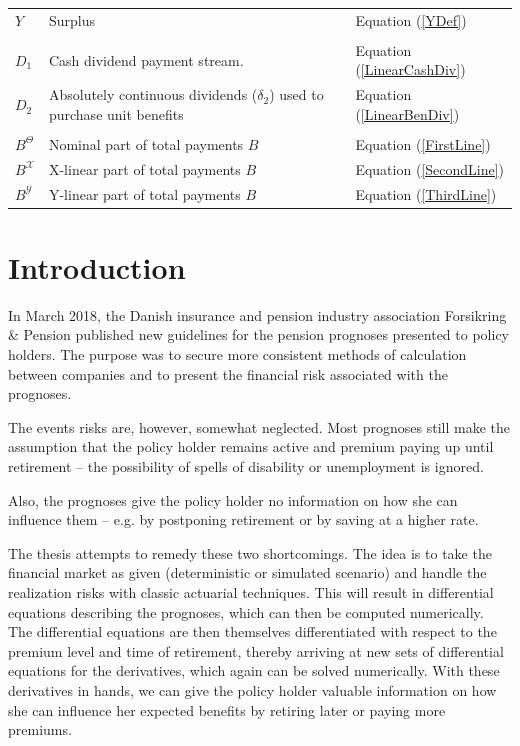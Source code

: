 \documentclass{article}
\newcommand{\1}[1]{\mathbbm{1}_{\left\lbrace #1 \right\rbrace}}
\theoremstyle{break}
\theoremstyle{remark}
\numberwithin{equation}{section}
\begin{document}
\begin{table}[H]
\begin{tabular}{lll}
		$Y$& Surplus & Equation (\ref{YDef}) \\
		&&\\
		$D_1$& Cash dividend payment stream. & Equation (\ref{LinearCashDiv})\\
		$D_2$& Absolutely continuous dividends ($\delta_2$) used to purchase unit benefits & Equation (\ref{LinearBenDiv}) \\
		&&\\
		$B^\Theta$& Nominal part of total payments $B$ & Equation (\ref{FirstLine}) \\
		$B^\mathcal{X}$& X-linear part of total payments $B$ & Equation (\ref{SecondLine})\\
		$B^\mathcal{Y}$& Y-linear part of total payments $B$ & Equation (\ref{ThirdLine})
	\end{tabular}
\end{table}

\newpage

\section{Introduction}

In March 2018, the Danish insurance and pension industry association Forsikring \& Pension published new guidelines for the pension prognoses presented to policy holders. The purpose was to secure more consistent methods of calculation between companies and to present the financial risk associated with the prognoses.

The events risks are, however, somewhat neglected. Most prognoses still make the assumption that the policy holder remains active and premium paying up until retirement -- the possibility of spells of disability or unemployment is ignored.


Also, the prognoses give the policy holder no information on how she can influence them -- e.g. by postponing retirement or by saving at a higher rate.

The thesis attempts to remedy these two shortcomings. The idea is to take the financial market as given (deterministic or simulated scenario) and handle the realization risks with classic actuarial techniques. This will result in differential equations describing the prognoses, which can then be computed numerically. The differential equations are then themselves differentiated with respect to the premium level and time of retirement, thereby arriving at new sets of differential equations for the derivatives, which again can be solved numerically. With these derivatives in hands, we can give the policy holder valuable information on how she can influence her expected benefits by retiring later or paying more premiums.
\end{document}
